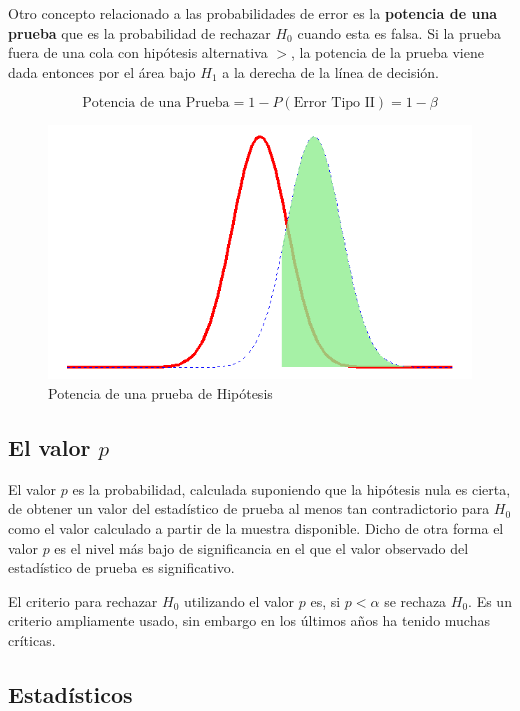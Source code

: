 \documentclass[]{book}
\begin{document}
Otro concepto relacionado a las probabilidades de error es la \textbf{potencia de una prueba} que es la probabilidad de rechazar \(H_0\) cuando esta es falsa. Si la prueba fuera de una cola con hipótesis alternativa \(>\), la potencia de la prueba viene dada entonces por el área bajo \(H_1\) a la derecha de la línea de decisión.

\begin{equation} 
\text{Potencia de una Prueba}=1-P\left(\text{Error Tipo II}\right)=1-\beta
\label{eq:power}
\end{equation}

\begin{figure}[h]

{\centering \includegraphics[width=0.5\linewidth]{power} 

}

\caption{Potencia de una prueba de Hipótesis}\label{fig:power}
\end{figure}

\hypertarget{pvalor}{%
\subsection{\texorpdfstring{El valor \(p\)}{El valor p}}\label{pvalor}}

El valor \(p\) es la probabilidad, calculada suponiendo que la hipótesis nula es cierta, de obtener un valor del estadístico de prueba al menos tan contradictorio para \(H_0\) como el valor calculado a partir de la muestra disponible. Dicho de otra forma el valor \(p\) es el nivel más bajo de significancia en el que el valor observado del estadístico de prueba es significativo.

El criterio para rechazar \(H_0\) utilizando el valor \(p\) es, si \(p<\alpha\) se rechaza \(H_0\). Es un criterio ampliamente usado, sin embargo en los últimos años ha tenido muchas críticas.

\hypertarget{estadisticos}{%
\subsection{Estadísticos}\label{estadisticos}}
\end{document}
